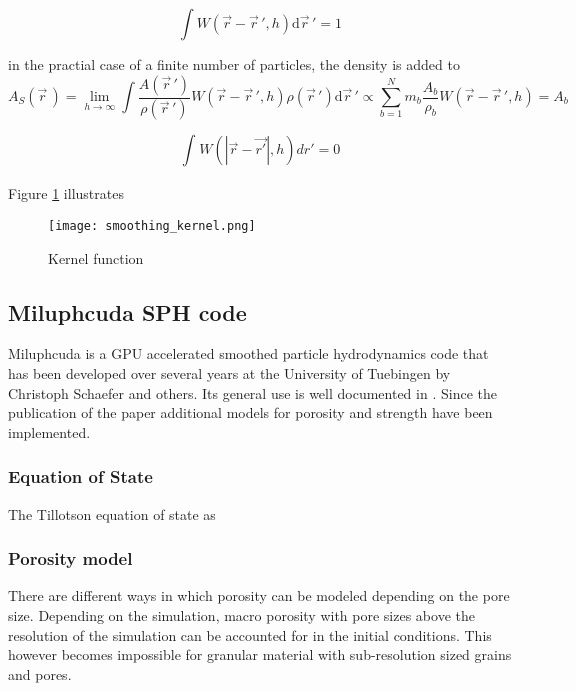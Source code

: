 \begin{equation} \label{eq:kernel_normalization}
    \int W(\vec{r} - \vec{r}\,', h)\mathrm d\vec{r}\,' = 1
\end{equation}

in the practial case of a finite number of particles, the density is added to
\begin{equation}
    {\displaystyle A_{S}({\vec {r}}\,)=\lim \limits _{h\rightarrow \infty }\int {\frac {A({\vec {r}}\,')}{\rho ({\vec {r}}\,')}}W({\vec {r}}-{\vec {r}}\,',h)\rho ({\vec {r}}\,')\mathrm {d} {\vec {r}}\,'\propto \sum \limits _{b=1}^{N}m_{b}{\frac {A_{b}}{\rho _{b}}}W({\vec {r}}-{\vec {r}}\,',h)=A_{b}}
\end{equation}




\begin{equation}
    \int_{}^{} W(|\vec{r} - \vec{r'}|, h)dr' = 0
\end{equation}


Figure \ref{fig:smoothing_kernel} illustrates

\begin{figure}[H]
    \centering
    \texttt{[image: smoothing\_kernel.png]}
    \caption{Kernel function \cite{wiki:smoothing_kernel}}
    \label{fig:smoothing_kernel}
\end{figure}

\subsection{Miluphcuda SPH code}
Miluphcuda is a GPU accelerated smoothed particle hydrodynamics code that has been developed over several years at the University of Tuebingen by Christoph Schaefer and others. Its general use is well documented in \cite{Schaefer_2016}. Since the publication of the paper additional models for porosity and strength have been implemented.


\subsubsection{Equation of State}
The Tillotson equation of state as


\subsubsection{Porosity model}
There are different ways in which porosity can be modeled depending on the pore size. Depending on the simulation, macro porosity with pore sizes above the resolution of the simulation can be accounted for in the initial conditions. This however becomes impossible for granular material with sub-resolution sized grains and pores.

